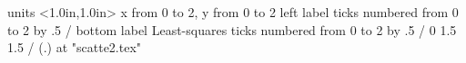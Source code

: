%
%

\beginpicture
  \setcoordinatesystem units <1.0in,1.0in>
  \ninerm
  \setplotarea x from 0 to 2, y from 0 to 2 
  \axis left label {} 
    ticks numbered from 0 to 2 by .5 /
  \axis bottom label {Least-squares}
    ticks numbered from 0 to 2 by .5 /
  0 1.5 1.5 /
  \setplotsymbol ({\rm .})
  at "scatte2.tex"
\endpicture
